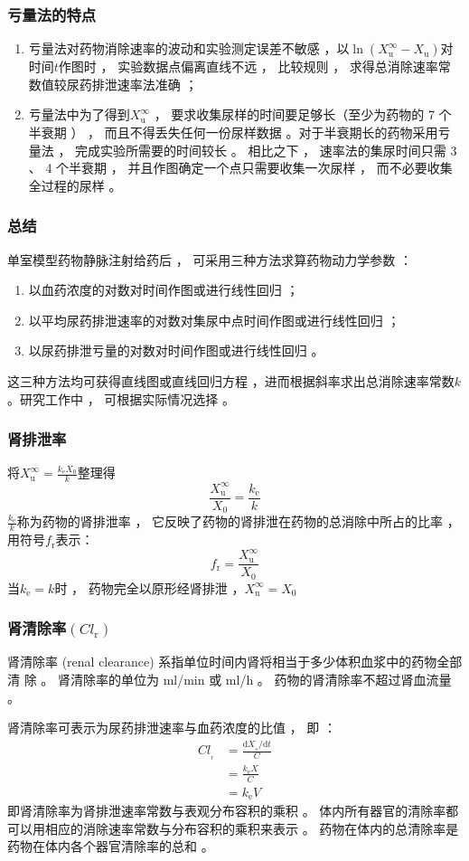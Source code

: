 \documentclass[dvipsnames, svgnames, x11names]{beamer}
\begin{document}
\begin{frame}
    \frametitle{亏量法的特点}
    \begin{enumerate}
      \item 亏量法对药物消除速率的波动和实验测定误差不敏感 ，以$\ln (X_{\mathrm{u}}^{\infty}-X_{\mathrm{u}})$对时间$t$作图时 ， 实验数据点偏离直线不远 ， 比较规则 ， 求得总消除速率常数值较尿药排泄速率法准确 ；
      \item 亏量法中为了得到$X_{\mathrm{u}}^{\infty}$ ， 要求收集尿样的时间要足够长（至少为药物的 7 个半衰期 ） ， 而且不得丢失任何一份尿样数据 。对于半衰期长的药物采用亏量法 ， 完成实验所需要的时间较长 。 相比之下 ， 速率法的集尿时间只需 3 、 4 个半衰期 ， 并且作图确定一个点只需要收集一次尿样 ， 而不必要收集全过程的尿样 。
    \end{enumerate}
\end{frame}


\begin{frame}
    \frametitle{总结}
    单室模型药物静脉注射给药后 ， 可采用三种方法求算药物动力学参数 ： 
    \begin{enumerate}
      \item 以血药浓度的对数对时间作图或进行线性回归 ；
      \item 以平均尿药排泄速率的对数对集尿中点时间作图或进行线性回归 ； 
      \item 以尿药排泄亏量的对数对时间作图或进行线性回归 。
    \end{enumerate}
      这三种方法均可获得直线图或直线回归方程 ，进而根据斜率求出总消除速率常数$k$。研究工作中 ， 可根据实际情况选择 。
\end{frame}


\begin{frame}
    \frametitle{肾排泄率}
    将$X_{\mathrm{u}}^{\infty}=\frac{k_{\mathrm{e}}X_{0}}{k}$整理得
    \[
        \frac{X_\mathrm{u}^{\infty}}{X_{0}}=\frac{k_{\mathrm{e}}}{k}
    \]
    $\frac{k_{\mathrm{e}}}{k}$称为药物的肾排泄率 ， 它反映了药物的肾排泄在药物的总消除中所占的比率 ， 用符号$f_\mathrm{r}$表示：
    \[
        f_\mathrm{r}=\frac{X_\mathrm{u}^{\infty}}{X_{0}}
    \]
    当$k_{\mathrm{e}}=k$时 ， 药物完全以原形经肾排泄 ，$X_{\mathrm{u}}^{\infty}=X_{0}$
\end{frame}
    

\begin{frame}
    \frametitle{肾清除率$(Cl_{\mathrm{r}})$}
    肾清除率 (renal clearance) 系指单位时间内肾将相当于多少体积血浆中的药物全部清
    除 。 肾清除率的单位为 ml/min 或 ml/h 。 药物的肾清除率不超过肾血流量 。

    肾清除率可表示为尿药排泄速率与血药浓度的比值 ， 即 ：
    \[
        \begin{aligned}
            Cl_{_r}&=\frac{\mathrm{d}X_{_u}/\mathrm{d}t}C \\
            &=\frac{k_{\mathrm{e}}X}{C} \\
            &=k_{\mathrm{\mathrm{e}}}V
        \end{aligned}
    \]
    即肾清除率为肾排泄速率常数与表观分布容积的乘积 。 体内所有器官的清除率都可以用相应的消除速率常数与分布容积的乘积来表示 。 药物在体内的总清除率是药物在体内各个器官清除率的总和 。
\end{frame}
\end{document}
